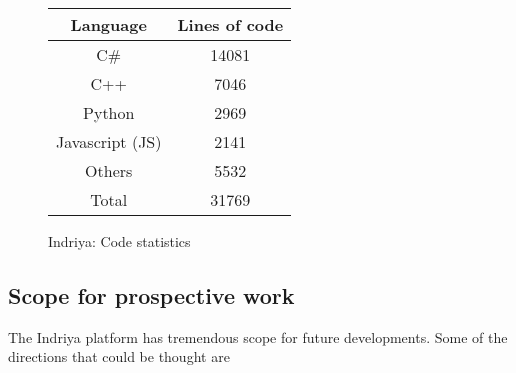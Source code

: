 \begin{figure}[!ht]
  \qquad
  \begin{tabular}[b]{|c|c|}\hline
Language & Lines of code \\ \hline 
C\# & 14081\\ 
C++ & 7046\\ 
Python & 2969\\ 
Javascript (JS) & 2141\\ 
Others & 5532\\ 
\hline 
 Total & 31769\\ \hline 
  \end{tabular}
  \caption{Indriya: Code statistics}
    \label{fig:code_stats}
\end{figure}

\subsection{Scope for prospective work}
  The Indriya platform has tremendous scope for future developments. Some of the directions that could be thought are

